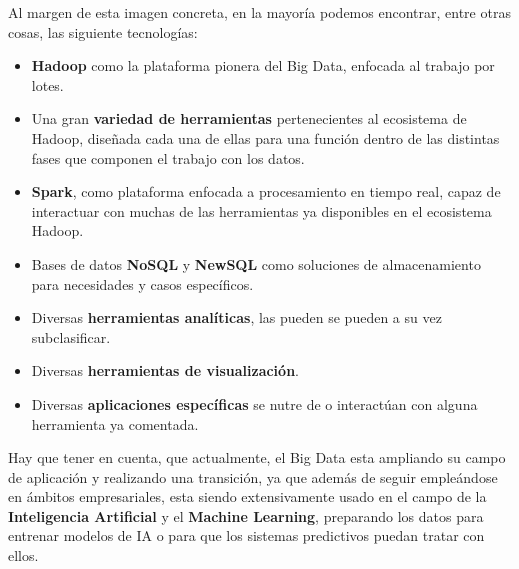 Al margen de esta imagen concreta, en la mayoría podemos encontrar, entre otras cosas, las siguiente tecnologías:

\begin{itemize}
	\item \textbf{Hadoop} como la plataforma pionera del Big Data, enfocada al trabajo por lotes.
	\item Una gran \textbf{variedad de herramientas} pertenecientes al ecosistema de Hadoop, diseñada cada una de ellas para una función dentro de las distintas fases que componen el trabajo con los datos.
	\item \textbf{Spark}, como plataforma enfocada a procesamiento en tiempo real, capaz de interactuar con muchas de las herramientas ya disponibles en el ecosistema Hadoop.
	\item Bases de datos \textbf{NoSQL} y \textbf{NewSQL} como soluciones de almacenamiento para necesidades y casos específicos.
	\item Diversas \textbf{herramientas analíticas}, las pueden se pueden a su vez subclasificar.
	\item Diversas \textbf{herramientas de visualización}.
	\item Diversas \textbf{aplicaciones específicas} se nutre de o interactúan con alguna herramienta ya comentada.
 \end{itemize}
 
 Hay que tener en cuenta, que actualmente, el Big Data esta ampliando su campo de aplicación y realizando una transición, ya que además de seguir empleándose en ámbitos empresariales, esta siendo extensivamente usado en el campo de la \textbf{Inteligencia Artificial} y el \textbf{Machine Learning}, preparando los datos para entrenar modelos de IA o para que los sistemas predictivos puedan tratar con ellos.

\newpage
 
\printglossary	

\newpage





 